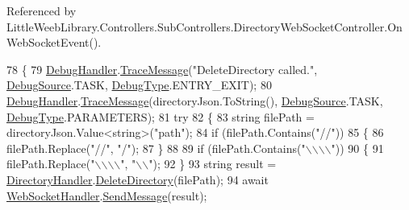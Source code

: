 Referenced by Little\+Weeb\+Library.\+Controllers.\+Sub\+Controllers.\+Directory\+Web\+Socket\+Controller.\+On\+Web\+Socket\+Event().


\begin{DoxyCode}
78         \{
79             \mbox{\hyperlink{class_little_weeb_library_1_1_handlers_1_1_debug_handler}{DebugHandler}}.\mbox{\hyperlink{class_little_weeb_library_1_1_handlers_1_1_debug_handler_afccb37dfd6b2114af72000c2f4fe4607}{TraceMessage}}(\textcolor{stringliteral}{"DeleteDirectory called."}, 
      \mbox{\hyperlink{namespace_little_weeb_library_1_1_handlers_a2a6ca0775121c9c503d58aa254d292be}{DebugSource}}.TASK, \mbox{\hyperlink{namespace_little_weeb_library_1_1_handlers_ab66019ed40462876ec4e61bb3ccb0a62}{DebugType}}.ENTRY\_EXIT);
80             \mbox{\hyperlink{class_little_weeb_library_1_1_handlers_1_1_debug_handler}{DebugHandler}}.\mbox{\hyperlink{class_little_weeb_library_1_1_handlers_1_1_debug_handler_afccb37dfd6b2114af72000c2f4fe4607}{TraceMessage}}(directoryJson.ToString(), 
      \mbox{\hyperlink{namespace_little_weeb_library_1_1_handlers_a2a6ca0775121c9c503d58aa254d292be}{DebugSource}}.TASK, \mbox{\hyperlink{namespace_little_weeb_library_1_1_handlers_ab66019ed40462876ec4e61bb3ccb0a62}{DebugType}}.PARAMETERS);
81             \textcolor{keywordflow}{try}
82             \{
83                 \textcolor{keywordtype}{string} filePath = directoryJson.Value<\textcolor{keywordtype}{string}>(\textcolor{stringliteral}{"path"});
84                 \textcolor{keywordflow}{if} (filePath.Contains(\textcolor{stringliteral}{"//"}))
85                 \{
86                     filePath.Replace(\textcolor{stringliteral}{"//"}, \textcolor{stringliteral}{"/"});
87                 \}
88 
89                 \textcolor{keywordflow}{if} (filePath.Contains(\textcolor{stringliteral}{"\(\backslash\)\(\backslash\)\(\backslash\)\(\backslash\)"}))
90                 \{
91                     filePath.Replace(\textcolor{stringliteral}{"\(\backslash\)\(\backslash\)\(\backslash\)\(\backslash\)"}, \textcolor{stringliteral}{"\(\backslash\)\(\backslash\)"});
92                 \}
93                 \textcolor{keywordtype}{string} result = \mbox{\hyperlink{class_little_weeb_library_1_1_handlers_1_1_directory_handler}{DirectoryHandler}}.\mbox{\hyperlink{class_little_weeb_library_1_1_handlers_1_1_directory_handler_aeae514c438e071fe95c42ff74e0fef9d}{DeleteDirectory}}(filePath);
94                 await \mbox{\hyperlink{class_little_weeb_library_1_1_handlers_1_1_web_socket_handler}{WebSocketHandler}}.\mbox{\hyperlink{class_little_weeb_library_1_1_handlers_1_1_web_socket_handler_a1de289d54d665a32c93478c68d3e6ad0}{SendMessage}}(result);

\end{DoxyCode}
